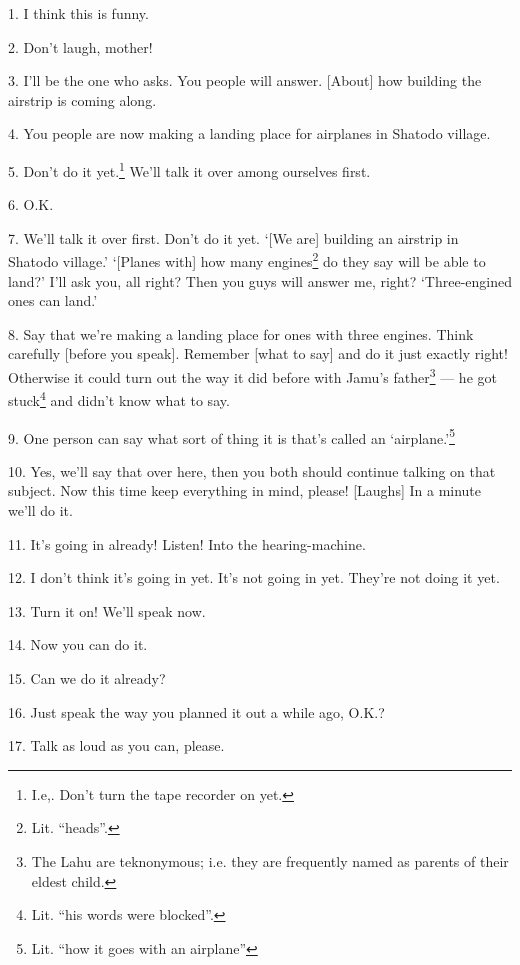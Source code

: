 \setcounter{footnote}{0}

1. I think this is funny.

2. Don't laugh, mother!

3. I'll be the one who asks. You people will answer. [About] how building the airstrip
is coming along.

4. You people are now making a landing place for airplanes in Shatodo village.

5. Don't do it yet.\footnote{I.e,. Don't turn the tape recorder on yet.} We'll talk it over among ourselves first.

6. O.K.

7. We'll talk it over first. Don't do it yet. `[We are] building an airstrip in
Shatodo village.' `[Planes with] how many engines\footnote{Lit. ``heads''.} do they say will be able to
land?' I'll ask you, all right? Then you guys will answer me, right? `Three-engined
ones can land.'

8. Say that we're making a landing place for ones with three engines. Think carefully
[before you speak]. Remember [what to say] and do it just exactly right! Otherwise
it could turn out the way it did before with Jamu's father\footnote{The Lahu are teknonymous; i.e. they are frequently named as parents of their eldest child.} --- he got stuck\footnote{Lit. ``his words were blocked''.}
and didn't know what to say.

9. One person can say what sort of thing it is that's called an `airplane.'\footnote{Lit. ``how it goes with an airplane''}

10. Yes, we'll say that over here, then you both should continue talking on that
subject. Now this time keep everything in mind, please! [Laughs] In a minute we'll
do it.

11. It's going in already! Listen! Into the hearing-machine.

12. I don't think it's going in yet. It's not going in yet. They're not doing it
yet.

13. Turn it on! We'll speak now.

14. Now you can do it.

15. Can we do it already?

16. Just speak the way you planned it out a while ago, O.K.?

17. Talk as loud as you can, please.

